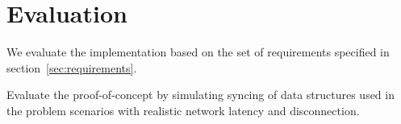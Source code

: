 
\chapter{Evaluation}\label{evaluation}

We evaluate the implementation based on the set of requirements specified in section~\ref{sec:requirements}.

Evaluate the proof-of-concept by simulating syncing of data structures
used in the problem scenarios with realistic network latency and
disconnection.